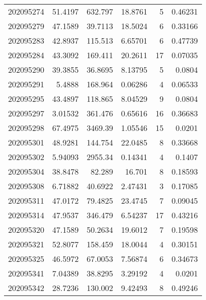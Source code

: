 \begin{tabular}{rrrrrr}
 202095274 &         51.4197  &      632.797  &           18.8761  &           5 & 0.46231 \\
 202095279 &         47.1589  &       39.7113 &           18.5024  &           6 & 0.33166 \\
 202095283 &         42.8937  &      115.513  &            6.65701 &           6 & 0.47739 \\
 202095284 &         43.3092  &      169.411  &           20.2611  &          17 & 0.07035 \\
 202095290 &         39.3855  &       36.8695 &            8.13795 &           5 & 0.0804  \\
 202095291 &          5.4888  &      168.964  &            0.06286 &           4 & 0.06533 \\
 202095295 &         43.4897  &      118.865  &            8.04529 &           9 & 0.0804  \\
 202095297 &          3.01532 &      361.476  &            0.65616 &          16 & 0.36683 \\
 202095298 &         67.4975  &     3469.39   &            1.05546 &          15 & 0.0201  \\
 202095301 &         48.9281  &      144.754  &           22.0485  &           8 & 0.33668 \\
 202095302 &          5.94093 &     2955.34   &            0.14341 &           4 & 0.1407  \\
 202095304 &         38.8478  &       82.289  &           16.701   &           8 & 0.18593 \\
 202095308 &          6.71882 &       40.6922 &            2.47431 &           3 & 0.17085 \\
 202095311 &         47.0172  &       79.4825 &           23.4745  &           7 & 0.09045 \\
 202095314 &         47.9537  &      346.479  &            6.54237 &          17 & 0.43216 \\
 202095320 &         47.1589  &       50.2634 &           19.6012  &           7 & 0.19598 \\
 202095321 &         52.8077  &      158.459  &           18.0044  &           4 & 0.30151 \\
 202095325 &         46.5972  &       67.0053 &            7.56874 &           6 & 0.34673 \\
 202095341 &          7.04389 &       38.8295 &            3.29192 &           4 & 0.0201  \\
 202095342 &         28.7236  &      130.002  &            9.42493 &           8 & 0.49246 \\

\end{tabular}
